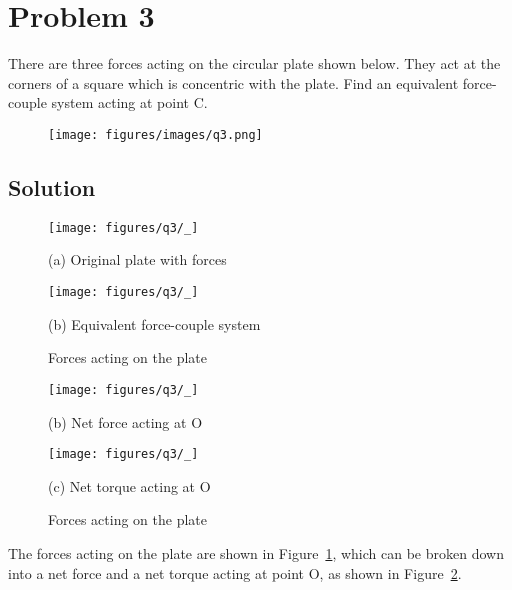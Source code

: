 \section*{Problem 3}

There are three forces acting on the circular plate shown below.
They act at the corners of a square which is concentric with the plate.
Find an equivalent force-couple system acting at point C.

\begin{figure*}[h]
    \centering
    \texttt{[image: figures/images/q3.png]}
\end{figure*}

\subsection*{Solution}

\begin{figure}[htb]
    \centering
    \begin{minipage}{0.5\textwidth}
        \centering
        \texttt{[image: figures/q3/\_]}
        \caption*{
            (a) Original plate with forces
        }
    \end{minipage}\hfill
    \begin{minipage}{0.4\textwidth}
        \centering
        \texttt{[image: figures/q3/\_]}
        \caption*{
            (b) Equivalent force-couple system
        }
    \end{minipage}
    \caption{
        Forces acting on the plate
    }\label{fig:q3-forces}
\end{figure}

\begin{figure}[htb]
    \centering
    \begin{minipage}{0.4\textwidth}
        \centering
        \texttt{[image: figures/q3/\_]}
        \caption*{
            (b) Net force acting at O
        }
    \end{minipage}\hfill
    \begin{minipage}{0.4\textwidth}
        \centering
        \texttt{[image: figures/q3/\_]}
        \caption*{
            (c) Net torque acting at O
        }
    \end{minipage}
    \caption{
        Forces acting on the plate
    }\label{fig:q3-net-forces}
\end{figure}

The forces acting on the plate are shown in Figure~\ref{fig:q3-forces}, which can be broken down into a net force and a net torque acting at point O, as shown in Figure~\ref{fig:q3-net-forces}.

